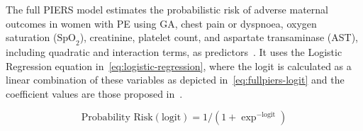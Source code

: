 \documentclass[diagnostics,article,accept,pdftex,moreauthors]{Definitions/mdpi}
\begin{document}
The full \ac{PIERS} model estimates the probabilistic
risk of adverse maternal outcomes in women with \ac{PE} {using}
\ac{GA}, chest pain or dyspnoea, oxygen saturation
({$\text{SpO}_2$}), creatinine, platelet count, and aspartate transaminase
(\ac{AST}), including quadratic and interaction terms, as
predictors~\cite{fullpiers_2011}. It uses the Logistic Regression
equation in~\eqref{eq:logistic-regression}, where the logit is
calculated as a linear combination of these variables as depicted
in~\eqref{eq:fullpiers-logit} and the coefficient values are those
{proposed} %
 in~\cite{fullpiers_2011}.
\begin{linenomath}
\begin{equation}
  \text{Probability Risk}(\text{logit})=1/(1+\exp^{-\text{logit}})
  \label{eq:logistic-regression}
\end{equation}
\end{linenomath}
\end{document}
